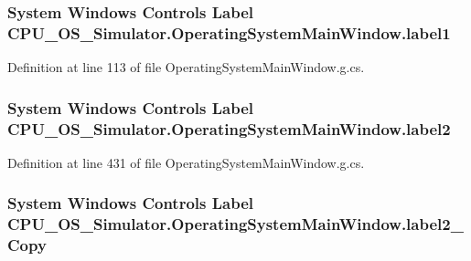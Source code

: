 \subsubsection[{label1}]{\setlength{\rightskip}{0pt plus 5cm}System Windows Controls Label C\+P\+U\+\_\+\+O\+S\+\_\+\+Simulator.\+Operating\+System\+Main\+Window.\+label1\hspace{0.3cm}{\ttfamily [package]}}\label{class_c_p_u___o_s___simulator_1_1_operating_system_main_window_a4a8e9f811e590b3af2e2391740077937}


Definition at line 113 of file Operating\+System\+Main\+Window.\+g.\+cs.

\hypertarget{class_c_p_u___o_s___simulator_1_1_operating_system_main_window_a28c78c8e714c58223e338c29f89fda83}{}
\subsubsection[{label2}]{\setlength{\rightskip}{0pt plus 5cm}System Windows Controls Label C\+P\+U\+\_\+\+O\+S\+\_\+\+Simulator.\+Operating\+System\+Main\+Window.\+label2\hspace{0.3cm}{\ttfamily [package]}}\label{class_c_p_u___o_s___simulator_1_1_operating_system_main_window_a28c78c8e714c58223e338c29f89fda83}


Definition at line 431 of file Operating\+System\+Main\+Window.\+g.\+cs.

\hypertarget{class_c_p_u___o_s___simulator_1_1_operating_system_main_window_abf6d8f5cfb34c8d41580c330c6af3a51}{}
\subsubsection[{label2\+\_\+\+Copy}]{\setlength{\rightskip}{0pt plus 5cm}System Windows Controls Label C\+P\+U\+\_\+\+O\+S\+\_\+\+Simulator.\+Operating\+System\+Main\+Window.\+label2\+\_\+\+Copy\hspace{0.3cm}{\ttfamily [package]}}\label{class_c_p_u___o_s___simulator_1_1_operating_system_main_window_abf6d8f5cfb34c8d41580c330c6af3a51}


